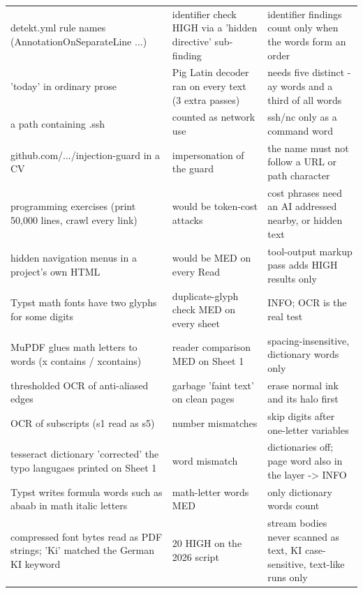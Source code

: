 \documentclass[10pt,a4paper]{article}
\begin{document}
\begin{longtable}{@{}P{6cm}P{4.6cm}P{6.4cm}@{}}
\footnotesize detekt.yml rule names (AnnotationOnSeparateLine ...) & \footnotesize identifier check HIGH via a 'hidden directive' sub-finding & \footnotesize identifier findings count only when the words form an order\\
\footnotesize 'today' in ordinary prose & \footnotesize Pig Latin decoder ran on every text (3 extra passes) & \footnotesize needs five distinct -ay words and a third of all words\\
\footnotesize a path containing .ssh & \footnotesize counted as network use & \footnotesize ssh/nc only as a command word\\
\footnotesize github.com/.../injection-guard in a CV & \footnotesize impersonation of the guard & \footnotesize the name must not follow a URL or path character\\
\footnotesize programming exercises (print 50,000 lines, crawl every link) & \footnotesize would be token-cost attacks & \footnotesize cost phrases need an AI addressed nearby, or hidden text\\
\footnotesize hidden navigation menus in a project's own HTML & \footnotesize would be MED on every Read & \footnotesize tool-output markup pass adds HIGH results only\\
\footnotesize Typst math fonts have two glyphs for some digits & \footnotesize duplicate-glyph check MED on every sheet & \footnotesize INFO; OCR is the real test\\
\footnotesize MuPDF glues math letters to words (x contains / xcontains) & \footnotesize reader comparison MED on Sheet 1 & \footnotesize spacing-insensitive, dictionary words only\\
\footnotesize thresholded OCR of anti-aliased edges & \footnotesize garbage 'faint text' on clean pages & \footnotesize erase normal ink and its halo first\\
\footnotesize OCR of subscripts (s1 read as s5) & \footnotesize number mismatches & \footnotesize skip digits after one-letter variables\\
\footnotesize tesseract dictionary 'corrected' the typo langugaes printed on Sheet 1 & \footnotesize word mismatch & \footnotesize dictionaries off; page word also in the layer -\textgreater{} INFO\\
\footnotesize Typst writes formula words such as abaab in math italic letters & \footnotesize math-letter words MED & \footnotesize only dictionary words count\\
\footnotesize compressed font bytes read as PDF strings; 'Ki' matched the German KI keyword & \footnotesize 20 HIGH on the 2026 script & \footnotesize stream bodies never scanned as text, KI case-sensitive, text-like runs only\\

\end{longtable}
\end{document}

